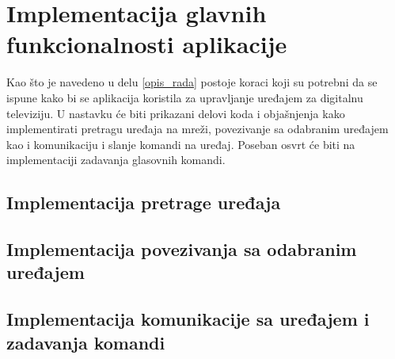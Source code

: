 \documentclass[implementacija.tex]{subfiles}
\begin{document}
\section{Implementacija glavnih funkcionalnosti aplikacije}
Kao što je navedeno u delu \ref{opis_rada} postoje koraci koji su potrebni da se ispune kako bi se aplikacija koristila za upravljanje uređajem za digitalnu televiziju. U nastavku će biti prikazani delovi koda i objašnjenja kako implementirati pretragu uređaja na mreži, povezivanje sa odabranim uređajem kao i komunikaciju i slanje komandi na uređaj. Poseban osvrt će biti na implementaciji zadavanja glasovnih komandi. 

\subsection{Implementacija pretrage uređaja}



\subsection{Implementacija povezivanja sa odabranim uređajem}


\subsection{Implementacija komunikacije sa uređajem i zadavanja komandi}








\end{document}
